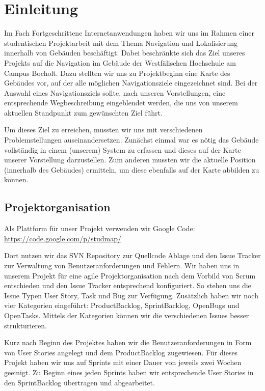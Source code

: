 \chapter{Einleitung}
Im Fach Fortgeschrittene Internetanwendungen haben wir uns im Rahmen einer studentischen Projektarbeit mit dem Thema Navigation und Lokalisierung innerhalb von Gebäuden beschäftigt. Dabei beschränkte sich das Ziel unseres Projekts auf die Navigation im Gebäude der Westfälischen Hochschule am Campus Bocholt.
Dazu stellten wir uns zu Projektbeginn eine Karte des Gebäudes vor, auf der alle möglichen Navigationsziele eingezeichnet sind. Bei der Auswahl eines Navigationsziels sollte, nach unseren Vorstellungen, eine entsprechende Wegbeschreibung eingeblendet werden, die uns von unserem aktuellen Standpunkt zum gewünschten Ziel führt.

Um dieses Ziel zu erreichen, mussten wir uns mit verschiedenen Problemstellungen auseinandersetzen. Zunächst einmal war es nötig das Gebäude vollständig in einem (unserem) System zu erfassen und dieses auf der Karte unserer Vorstellung darzustellen. Zum anderen mussten wir die aktuelle Position (innerhalb des Gebäudes) ermitteln, um diese ebenfalls auf der Karte abbilden zu können.

\section{Projektorganisation}
Als Plattform für unser Projekt verwenden wir Google Code:\\
\href{https://code.google.com/p/studmap/}{https://code.google.com/p/studmap/}

Dort nutzen wir das SVN Repository zur Quellcode Ablage und den Issue Tracker zur Verwaltung von Benutzeranforderungen und Fehlern. Wir haben uns in unserem Projekt für eine agile Projektorganisation nach dem Vorbild von Scrum entschieden und den Issue Tracker entsprechend konfiguriert. So stehen uns die Issue Typen User Story, Task und Bug zur Verfügung. Zusätzlich haben wir noch vier Kategorien eingeführt: ProductBacklog, SprintBacklog, OpenBugs und OpenTasks. Mittels der Kategorien können wir die verschiedenen Issues besser strukturieren.

Kurz nach Beginn des Projektes haben wir die Benutzeranforderungen in Form von User Stories angelegt und dem ProductBacklog zugewiesen. Für dieses Projekt haben wir uns auf Sprints mit einer Dauer von jeweils zwei Wochen geeinigt. Zu Beginn eines jeden Sprints haben wir entsprechende User Stories in den SprintBacklog übertragen und abgearbeitet.